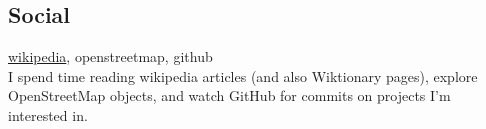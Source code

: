 \documentclass {article}
\begin{document}
    \subsection{Social}
    \href{https://en.wikipedia.org/wiki/User:Rwp0}{wikipedia}, openstreetmap, github\\
    I spend time reading wikipedia articles (and also Wiktionary pages), explore OpenStreetMap objects, and watch GitHub for commits on projects I'm interested in.
  {} %
\end{document}
